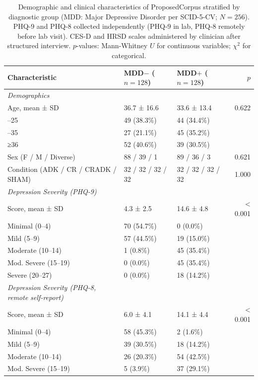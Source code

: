 \begin{table}[ht]
\centering
\small
\caption{Demographic and clinical characteristics of ProposedCorpus stratified by diagnostic group (MDD: Major Depressive Disorder per SCID-5-CV; $N=256$). PHQ-9 and PHQ-8 collected independently (PHQ-9 in lab, PHQ-8 remotely before lab visit). CES-D and HRSD scales administered by clinician after structured interview. $p$-values: Mann-Whitney $U$ for continuous variables; $\chi^2$ for categorical.}
\label{tab:proposed_demographics}
\begin{tabular}{lllr}
\toprule
\textbf{Characteristic} & \textbf{MDD$-$ ($n=128$)} & \textbf{MDD$+$ ($n=128$)} & $p$ \\
\midrule
\textit{Demographics} & & & \\
Age, mean ± SD & 36.7 ± 16.6 & 33.6 ± 13.4 & 0.622 \\
\quad 18–25 & 49 (38.3\%) & 44 (34.4\%) &  \\
\quad 26–35 & 27 (21.1\%) & 45 (35.2\%) &  \\
\quad ≥36 & 52 (40.6\%) & 39 (30.5\%) &  \\
Sex (F / M / Diverse) & 88 / 39 / 1 & 89 / 36 / 3 & 0.621 \\
Condition (ADK / CR / CRADK / SHAM) & 32 / 32 / 32 / 32 & 32 / 32 / 32 / 32 & 1.000 \\
\textit{Depression Severity (PHQ-9)} & & & \\
Score, mean ± SD & 4.3 ± 2.5 & 14.6 ± 4.8 & < 0.001 \\
\quad Minimal (0–4) & 70 (54.7\%) & 0 (0.0\%) &  \\
\quad Mild (5–9) & 57 (44.5\%) & 19 (15.0\%) &  \\
\quad Moderate (10–14) & 1 (0.8\%) & 45 (35.4\%) &  \\
\quad Mod. Severe (15–19) & 0 (0.0\%) & 45 (35.4\%) &  \\
\quad Severe (20–27) & 0 (0.0\%) & 18 (14.2\%) &  \\
\textit{Depression Severity (PHQ-8, remote self-report)} & & & \\
Score, mean ± SD & 6.0 ± 4.1 & 14.1 ± 4.4 & < 0.001 \\
\quad Minimal (0–4) & 58 (45.3\%) & 2 (1.6\%) &  \\
\quad Mild (5–9) & 39 (30.5\%) & 18 (14.2\%) &  \\
\quad Moderate (10–14) & 26 (20.3\%) & 54 (42.5\%) &  \\
\quad Mod. Severe (15–19) & 5 (3.9\%) & 37 (29.1\%) &  \\

\end{tabular}
\end{table}
